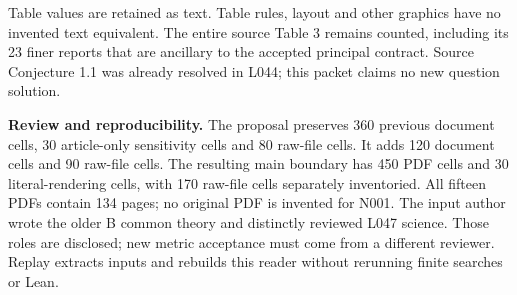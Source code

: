 \documentclass[11pt]{article}
\begin{document}
Table values are retained as text. Table rules, layout and other graphics have
no invented text equivalent. The entire source Table 3 remains counted, including
its 23 finer reports that are ancillary to the accepted principal contract.
Source Conjecture 1.1 was already resolved in L044; this packet claims no new
question solution.

\textbf{Review and reproducibility.}
The proposal preserves 360 previous document cells, 30 article-only sensitivity
cells and 80 raw-file cells. It adds 120 document cells and 90 raw-file cells.
The resulting main boundary has 450 PDF cells and 30 literal-rendering cells,
with 170 raw-file cells separately inventoried. All fifteen PDFs contain 134
pages; no original PDF is invented for N001. The input author wrote the older
B common theory and distinctly reviewed L047 science. Those roles are disclosed;
new metric acceptance must come from a different reviewer. Replay extracts
inputs and rebuilds this reader without rerunning finite searches or Lean.
\end{document}
